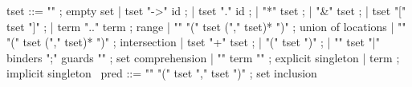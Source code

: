 \begin{syntax}
  tset ::= "\empty" ; empty set
       | tset "->" id ;
       | tset "." id ;
       | "*" tset ;
       | "&" tset ;
       | tset "[" tset "]" ;
       | term ".." term ; range
       | "\union" "(" tset ("," tset)* ")" ; union of locations
       | "\inter" "(" tset ("," tset)* ")" ; intersection
       | tset "+" tset ;
       | "(" tset ")" ;
       | "{" tset "|" binders ";" guards "}" ; set comprehension
       | { "{" term "}" } ; explicit singleton
       | term ; implicit singleton
       \
  pred ::= {"\subset" "(" tset "," tset ")"} ; set inclusion
\end{syntax}
